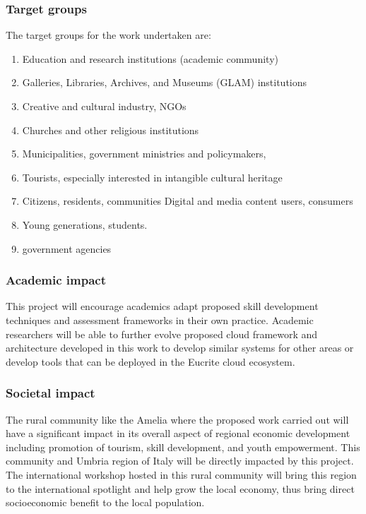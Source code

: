 \subsubsection{Target groups}\label{subsubsec-Target}
The target groups for the work undertaken are:
\begin{enumerate}[nosep]
\item Education and research  institutions (academic  community)
\item Galleries, Libraries,  Archives, and Museums (GLAM)  institutions
\item Creative and cultural industry, NGOs
\item Churches and other religious institutions
\item Municipalities, government ministries and policymakers,
\item Tourists, especially interested in intangible cultural heritage
\item Citizens, residents, communities Digital and media content users, consumers
\item Young generations, students.
\item government agencies
\end{enumerate}

\subsubsection{Academic impact}
This project will encourage academics adapt proposed skill development techniques and assessment frameworks in their own practice. Academic researchers will be able to further evolve proposed cloud framework and architecture developed in this work to develop similar systems for other areas or develop tools that can be deployed in the Eucrite cloud ecosystem.


\subsubsection{Societal impact}
The rural community like the Amelia where the proposed work carried out will have a significant impact in its overall aspect of regional economic development including promotion of tourism, skill development, and youth empowerment. This community and Umbria region of Italy will be directly impacted by this project. The international workshop hosted in this rural community will bring this region to the international spotlight and help grow the local economy, thus bring direct socioeconomic benefit to the local population.

